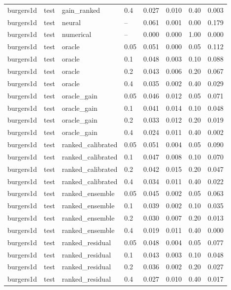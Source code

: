 \begin{tabular}{llllrrrr}
burgers1d & test & gain\_ranked & 0.4 & 0.027 & 0.010 & 0.40 & 0.003 \\
burgers1d & test & neural & -- & 0.061 & 0.001 & 0.00 & 0.179 \\
burgers1d & test & numerical & -- & 0.000 & 0.000 & 1.00 & 0.000 \\
burgers1d & test & oracle & 0.05 & 0.051 & 0.000 & 0.05 & 0.112 \\
burgers1d & test & oracle & 0.1 & 0.048 & 0.003 & 0.10 & 0.088 \\
burgers1d & test & oracle & 0.2 & 0.043 & 0.006 & 0.20 & 0.067 \\
burgers1d & test & oracle & 0.4 & 0.035 & 0.002 & 0.40 & 0.029 \\
burgers1d & test & oracle\_gain & 0.05 & 0.046 & 0.012 & 0.05 & 0.071 \\
burgers1d & test & oracle\_gain & 0.1 & 0.041 & 0.014 & 0.10 & 0.048 \\
burgers1d & test & oracle\_gain & 0.2 & 0.033 & 0.012 & 0.20 & 0.019 \\
burgers1d & test & oracle\_gain & 0.4 & 0.024 & 0.011 & 0.40 & 0.002 \\
burgers1d & test & ranked\_calibrated & 0.05 & 0.051 & 0.004 & 0.05 & 0.090 \\
burgers1d & test & ranked\_calibrated & 0.1 & 0.047 & 0.008 & 0.10 & 0.070 \\
burgers1d & test & ranked\_calibrated & 0.2 & 0.042 & 0.015 & 0.20 & 0.047 \\
burgers1d & test & ranked\_calibrated & 0.4 & 0.034 & 0.011 & 0.40 & 0.022 \\
burgers1d & test & ranked\_ensemble & 0.05 & 0.045 & 0.002 & 0.05 & 0.063 \\
burgers1d & test & ranked\_ensemble & 0.1 & 0.039 & 0.002 & 0.10 & 0.035 \\
burgers1d & test & ranked\_ensemble & 0.2 & 0.030 & 0.007 & 0.20 & 0.013 \\
burgers1d & test & ranked\_ensemble & 0.4 & 0.019 & 0.011 & 0.40 & 0.000 \\
burgers1d & test & ranked\_residual & 0.05 & 0.048 & 0.004 & 0.05 & 0.077 \\
burgers1d & test & ranked\_residual & 0.1 & 0.043 & 0.003 & 0.10 & 0.048 \\
burgers1d & test & ranked\_residual & 0.2 & 0.036 & 0.002 & 0.20 & 0.027 \\
burgers1d & test & ranked\_residual & 0.4 & 0.027 & 0.010 & 0.40 & 0.017 \\

\end{tabular}
